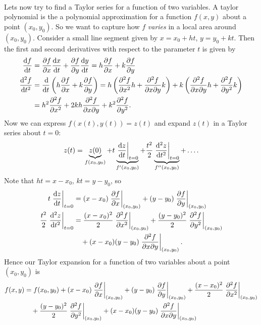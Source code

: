 \documentclass[../multivariate_calculus.tex]{subfiles}
\begin{document}
        \paragraph{}
        Lets now try to find a Taylor series for a function of two variables.
        A taylor polynomial is the a polynomial approximation for a function $f(x,y)$ about a point $(x_0,y_0)$.
        So we want to capture how $f$ \textit{varies} in a local area around $(x_0,y_0)$.
        Consider a small line segment given by $x=x_0+ht$, $y=y_0+kt$.
        Then the first and second derivatives with respect to the parameter $t$ is given by
        \begin{align}
            \dv{f}{t}&=\pdv{f}{x}\dv{x}{t}+\pdv{f}{y}\dv{y}{t}=h\pdv{f}{x}+k\pdv{f}{y}\\
            \dv[2]{f}{t}&=\dv{}{t}\left(h\pdv{f}{x}+k\pdv{f}{y}\right)=h\left(\pdv[2]{f}{x}h+\frac{\partial^2 f}{\partial x\partial y}k\right)+k\left(\frac{\partial^2 f}{\partial x\partial y}h+\pdv[2]{f}{y}k\right)\\
            &=h^2\pdv[2]{f}{x}+2kh\frac{\partial^2 f}{\partial x\partial y}+k^2\pdv[2]{f}{y}.
        \end{align}
        Now we can express $f(x(t),y(t))=z(t)$ and expand $z(t)$ in a Taylor series about $t=0$:
        \begin{equation}
            z(t)=\underbrace{z(0)}_{f(x_0,y_0)}+t\underbrace{\left.\dv{z}{t}\right|_{t=0}}_{f^\prime(x_0,y_0)}+\frac{t^2}{2}\underbrace{\left.\dv[2]{z}{t}\right|_{t=0}}_{f^{\prime\prime}(x_0,y_0)}+\dots.
        \end{equation}
        Note that $ht=x-x_0$, $kt=y-y_0$, so
        \begin{align}
            t\left.\dv{z}{t}\right|_{t=0}&=(x-x_0)\left.\pdv{f}{x}\right|_{(x_0,y_0)}+(y-y_0)\left.\pdv{f}{y}\right|_{(x_0,y_0)}\\
            \frac{t^2}{2}\left.\dv[2]{z}{t}\right|_{t=0}&=\frac{(x-x_0)^2}{2}\left.\pdv[2]{f}{x}\right|_{(x_0,y_0)}+\frac{(y-y_0)^2}{2}\left.\pdv[2]{f}{y}\right|_{(x_0,y_0)}\\
            &\quad+(x-x_0)(y-y_0)\left.\frac{\partial^2 f}{\partial x\partial y}\right|_{(x_0,y_0)}.
        \end{align}
        Hence our Taylor expansion for a function of two variables about a point $(x_0,y_0)$ is
        \begin{align}\label{eq:taylor-series-2D}
            f(x,y)&=f(x_0,y_0)+(x-x_0)\left.\pdv{f}{x}\right|_{(x_0,y_0)}+(y-y_0)\left.\pdv{f}{y}\right|_{(x_0,y_0)}+\frac{(x-x_0)^2}{2}\left.\pdv[2]{f}{x}\right|_{(x_0,y_0)}\\
            &\quad+\frac{(y-y_0)^2}{2}\left.\pdv[2]{f}{y}\right|_{(x_0,y_0)}+(x-x_0)(y-y_0)\left.\frac{\partial^2 f}{\partial x\partial y}\right|_{(x_0,y_0)}
        \end{align}
\end{document}

